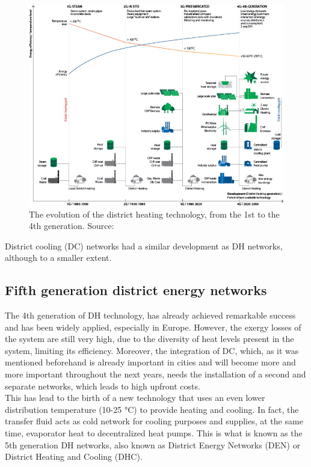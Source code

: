 \documentclass{article}
\begin{document}
\begin{figure}[h!]
\centering
\includegraphics[width=1\textwidth]{4GDH.jpg}
\caption{The evolution of the district heating technology, from the 1st to the 4th generation. Source: \cite{lund4thGenerationDistrict2014}}
\label{fig:4GDH}
\end{figure}

District cooling (DC) networks had a similar development as DH networks, although to a smaller extent. 

\subsection{Fifth generation district energy networks}
The 4th generation of DH technology, has already achieved remarkable success and has been widely applied, especially in Europe. However, the exergy losses of the system are still very high, due to the diversity of heat levels present in the system, limiting its efficiency. Moreover, the integration of DC, which, as it was mentioned beforehand is already important in cities and will become more and more important throughout the next years, needs the installation of a second and separate networks, which leads to high upfront costs. \\
This has lead to the birth of a new technology that uses an even lower distribution temperature (10-25 \si{\celsius}) to provide heating and cooling. In fact, the transfer fluid acts as cold network for cooling purposes and supplies, at the same time, evaporator heat to decentralized heat pumps. This is what is known as the 5th generation DH networks, also known as District Energy Networks (DEN) or District Heating and Cooling (DHC).\\
\end{document}
